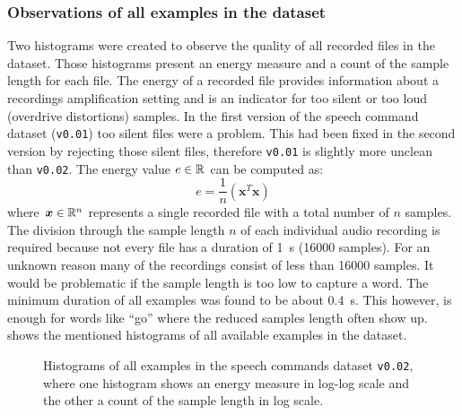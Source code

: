 \subsubsection{Observations of all examples in the dataset}
Two histograms were created to observe the quality of all recorded files in the dataset.
Those histograms present an energy measure and a count of the sample length for each file.
The energy of a recorded file provides information about a recordings amplification setting and is an indicator for too silent or too loud (overdrive distortions) samples.
In the first version of the speech command dataset (\texttt{v0.01}) too silent files were a problem.
This had been fixed in the second version by rejecting those silent files, therefore \texttt{v0.01} is slightly more unclean than \texttt{v0.02}.
The energy value $e \in \mathbb{R}$ can be computed as:
\begin{equation}\label{eq:exp_dataset_energy}
  e = \frac{1}{n} \left( \bm{x}^T \bm{x} \right)
\end{equation}
where $\bm{x} \in \mathbb{R}^n$ represents a single recorded file with a total number of $n$ samples.
The division through the sample length $n$ of each individual audio recording is required because not every file has a duration of \SI{1}{\second} (16000 samples).
For an unknown reason many of the recordings consist of less than 16000 samples.
It would be problematic if the sample length is too low to capture a word.
The minimum duration of all examples was found to be about \SI{0.4}{\second}.
This however, is enough for words like \enquote{go} where the reduced samples length often show up.
 shows the mentioned histograms of all available examples in the dataset.
\begin{figure}[!ht]
  \centering
    \qquad
  \caption{Histograms of all examples in the speech commands dataset \texttt{v0.02}, where one histogram shows an energy measure in log-log scale and the other a count of the sample length in log scale.}
  \label{fig:exp_dataset_hist}
\end{figure}
